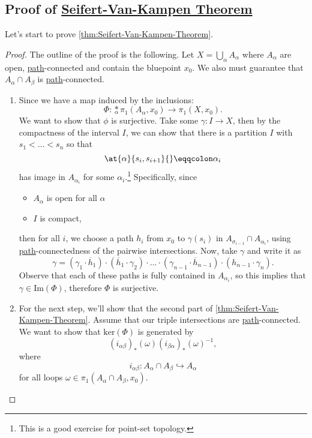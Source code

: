 \subsection{Proof of \hyperref[thm:Seifert-Van-Kampen-Theorem]{Seifert-Van-Kampen Theorem}}
Let's start to prove \autoref{thm:Seifert-Van-Kampen-Theorem}.
\begin{proof}\label{pf:thm:Seifert-Van-Kampen-Theorem}
	The outline of the proof is the following. Let \(X = \bigcup\limits_{\alpha}A_\alpha \) where \(A_\alpha \) are open, \hyperref[def:path]{path}-connected
	and contain the bluepoint \(x_0\). We also must guarantee that \(A_\alpha \cap A_\beta \) is \hyperref[def:path]{path}-connected.

	\begin{enumerate}
		\item Since we have a map induced by the inclusions:
		      \[
			      \Phi \colon \underset{\alpha}{\ast} \pi _1(A_\alpha , x_0)\to \pi _1(X, x_0).
		      \]
		      We want to show that \(\phi \) is surjective. Take some \(\gamma \colon I\to X\), then by the compactness of the interval \(I\), we can
		      show that there is a partition \(I\) with \(s_1<\ldots <s_n \) so that
		      \[
			      \at{\alpha }{s_{i}, s_{i+1}}{} \eqqcolon \alpha _{i}
		      \]
		      has image in \(A_{\alpha_{i}}\) for some \(\alpha _{i}\).\footnote{This is a good exercise for point-set topology.}
		      Specifically, since
		      \begin{itemize}
			      \item \(A_{\alpha }\) is open for all \(\alpha \)
			      \item \(I\) is compact,
		      \end{itemize}
		      then for all \(i\), we choose a path \(h_{i}\) from \(x_0\) to \(\gamma (s_{i})\) in \(A_{\sigma _{i-1}}\cap A_{\alpha _{i}}\), using
		      \hyperref[def:path]{path}-connectedness of the pairwise intersections. Now, take \(\gamma \) and write it as
		      \[
			      \gamma = (\gamma _1\cdot \overline{h} _1)\cdot (\overline{h} _1\cdot \gamma _2)\cdot \ldots \cdot (\gamma_{n-1}\cdot \overline{h} _{n-1}) \cdot (h_{n-1}\cdot \gamma _n).
		      \]
		      Observe that each of these paths is fully contained in \(A_{\alpha _{i}}\), so this implies that \(\gamma \in \mathrm{Im} (\Phi )\), therefore
		      \(\Phi \) is surjective.
		\item For the next step, we'll show that the second part of \autoref{thm:Seifert-Van-Kampen-Theorem}. Assume that our triple intersections are \hyperref[def:path]{path}-connected.
		      We want to show that \(\mathrm{ker}(\Phi ) \) is generated by
		      \[
			      (i_{\alpha \beta })_\ast (\omega )(i_{\beta \alpha })_\ast (\omega )^{-1},
		      \]
		      where
		      \[
			      i_{\alpha \beta }\colon A_\alpha \cap A_\beta \hookrightarrow A_\alpha
		      \]
		      for all loops \(\omega \in\pi_1(A_\alpha \cap A_\beta , x_0)\).


\end{enumerate}
\end{proof}

